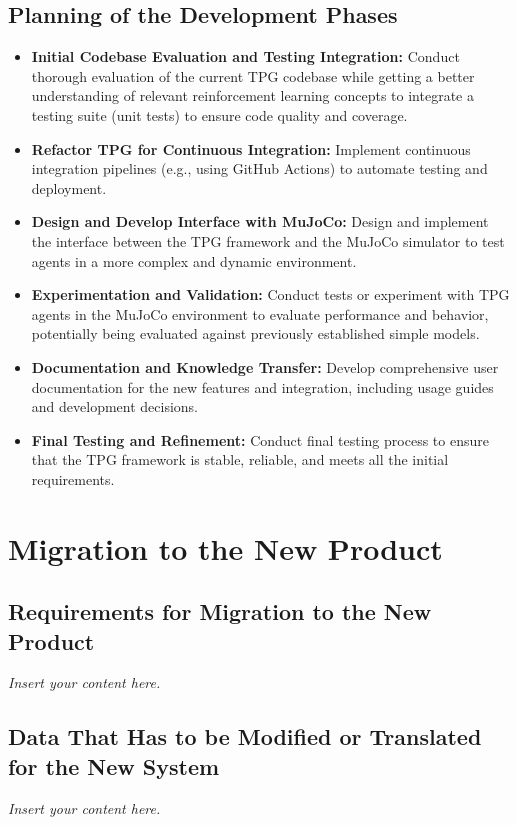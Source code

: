 \documentclass[12pt]{article}
\newcommand{\lips}{\textit{Insert your content here.}}
\begin{document}
\subsection{Planning of the Development Phases}
\begin{itemize}

  \item \textbf{Initial Codebase Evaluation and Testing Integration:} Conduct thorough evaluation of the current TPG codebase while getting a better understanding of relevant reinforcement learning concepts to integrate a testing suite (unit tests) to ensure code quality and coverage.
  \item \textbf{Refactor TPG for Continuous Integration:}  Implement continuous integration pipelines (e.g., using GitHub Actions) to automate testing and deployment.
  \item \textbf{Design and Develop Interface with MuJoCo:} Design and implement the interface between the TPG framework and the MuJoCo simulator to test agents in a more complex and dynamic environment.
  \item \textbf{Experimentation and Validation:} Conduct tests or experiment with TPG agents in the MuJoCo environment to evaluate performance and behavior, potentially being evaluated against previously established simple models.
  \item \textbf{Documentation and Knowledge Transfer:} Develop comprehensive user documentation for the new features and integration, including usage guides and development decisions.
  \item \textbf{Final Testing and Refinement:} Conduct final testing process  to ensure that the TPG framework is stable, reliable, and meets all the initial requirements.

\end{itemize}

\section{Migration to the New Product}
\subsection{Requirements for Migration to the New Product}
\lips
\subsection{Data That Has to be Modified or Translated for the New System}
\lips
\end{document}
